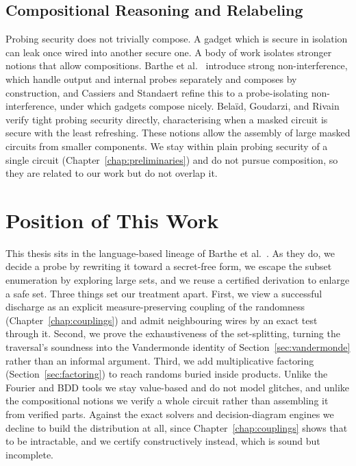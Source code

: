   \subsection{Compositional Reasoning and Relabeling}
  \label{sec:related-composition}

  Probing security does not trivially compose. A gadget which is secure in isolation can leak once
  wired into another secure one. A body of work isolates stronger notions that allow compositions. Barthe et
  al.\ \parencite{barthe2016strong} introduce strong non-interference, which handle
  output and internal probes separately and composes by construction, and Cassiers
  and Standaert \parencite{cassiers2020trivially} refine this to a probe-isolating
  non-interference, under which gadgets compose nicely. Belaïd, Goudarzi, and
  Rivain \parencite{belaid2018tight} verify tight probing security directly,
  characterising when a masked circuit is secure with the least refreshing. These
  notions allow the assembly of large masked circuits from smaller components. We stay within
  plain probing security of a single circuit (Chapter~\ref{chap:preliminaries}) and do
  not pursue composition, so they are related to our work but do not overlap it.

\section{Position of This Work}
\label{sec:related-position}

This thesis sits in the language-based lineage of Barthe et al.\
\parencite{barthe2015verified, 10.1007/978-3-030-29959-0_15}. As they do, we decide
a probe by rewriting it toward a secret-free form, we escape the subset enumeration
by exploring large sets, and we reuse a certified derivation to enlarge a safe set.
Three things set our treatment apart. First, we view a successful discharge as an
explicit measure-preserving coupling of the randomness
(Chapter~\ref{chap:couplings}) and admit neighbouring wires by an exact test
through it. Second, we prove the
exhaustiveness of the set-splitting, turning the traversal's soundness into the
Vandermonde identity of Section~\ref{sec:vandermonde} rather than an informal %
argument. Third, we add multiplicative factoring (Section~\ref{sec:factoring}) to
reach randoms buried inside products.
Unlike the Fourier and BDD
tools we stay value-based and do not model glitches, and unlike the compositional
notions we verify a whole circuit rather than assembling it from verified parts.
Against the exact solvers and decision-diagram engines we decline to build the
distribution at all, since Chapter~\ref{chap:couplings} shows that to be
intractable, and we certify constructively instead, which is sound but incomplete.
